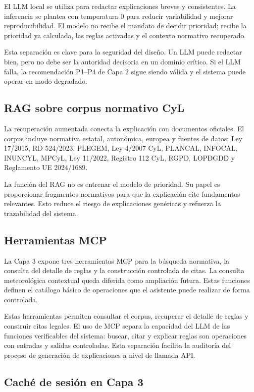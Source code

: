 El LLM local se utiliza para redactar explicaciones breves y consistentes. La inferencia se plantea con temperatura 0 para reducir variabilidad y mejorar reproducibilidad. El modelo no recibe el mandato de decidir prioridad; recibe la prioridad ya calculada, las reglas activadas y el contexto normativo recuperado.

Esta separación es clave para la seguridad del diseño. Un LLM puede redactar bien, pero no debe ser la autoridad decisoria en un dominio crítico. Si el LLM falla, la recomendación P1--P4 de Capa 2 sigue siendo válida y el sistema puede operar en modo degradado.

\subsection{RAG sobre corpus normativo CyL}

La recuperación aumentada conecta la explicación con documentos oficiales. El corpus incluye normativa estatal, autonómica, europea y fuentes de datos: Ley 17/2015, RD 524/2023, PLEGEM, Ley 4/2007 CyL, PLANCAL, INFOCAL, INUNCYL, MPCyL, Ley 11/2022, Registro 112 CyL, RGPD, LOPDGDD y Reglamento UE 2024/1689.

La función del RAG no es entrenar el modelo de prioridad. Su papel es proporcionar fragmentos normativos para que la explicación cite fundamentos relevantes. Esto reduce el riesgo de explicaciones genéricas y refuerza la trazabilidad del sistema.

\subsection{Herramientas MCP}

La Capa 3 expone tres herramientas MCP para la búsqueda normativa, la consulta del detalle de reglas y la construcción controlada de citas. La consulta meteorológica contextual queda diferida como ampliación futura. Estas funciones definen el catálogo básico de operaciones que el asistente puede realizar de forma controlada.

Estas herramientas permiten consultar el corpus, recuperar el detalle de reglas y construir citas legales. El uso de MCP separa la capacidad del LLM de las funciones verificables del sistema: buscar, citar y explicar reglas son operaciones con entradas y salidas controladas. Esta separación facilita la auditoría del proceso de generación de explicaciones a nivel de llamada API.

\subsection{Caché de sesión en Capa 3}

